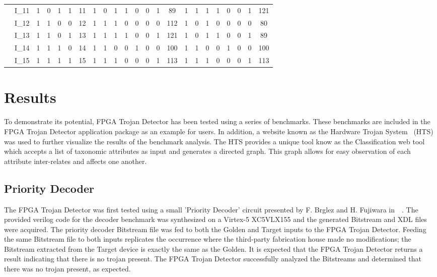 \documentclass[journal, hidelinks]{IEEEtran}
\begin{document}
\begin{table}[b!]
\begin{tabular}{CC|C|C|C|C|C||C|C|C|C|C|C|C|C||C|C|C|C|C|C|C|C|}
		 & I_{11} & 1 & 0 & 1 & 1 & 11 & 1 & 0 & 1 & 1 & 0 & 0 & 1 & 89 & 1 & 1 & 1 & 1 & 0 & 0 & 1 & 121 \\ 
		 & I_{12} & 1 & 1 & 0 & 0 & 12 & 1 & 1 & 1 & 0 & 0 & 0 & 0 & 112 & 1 & 0 & 1 & 0 & 0 & 0 & 0 & 80 \\ 
		 & I_{13} & 1 & 1 & 0 & 1 & 13 & 1 & 1 & 1 & 1 & 0 & 0 & 1 & 121 & 1 & 0 & 1 & 1 & 0 & 0 & 1 & 89 \\ 
		 & I_{14} & 1 & 1 & 1 & 0 & 14 & 1 & 1 & 0 & 0 & 1 & 0 & 0 & 100 & 1 & 1 & 0 & 0 & 1 & 0 & 0 & 100 \\ 
		 & I_{15} & 1 & 1 & 1 & 1 & 15 & 1 & 1 & 1 & 0 & 0 & 0 & 1 & 113 & 1 & 1 & 1 & 0 & 0 & 0 & 1 & 113 \\ \hline
	\end{tabular}
\end{table}
\section{Results} \label{sec:results}
To demonstrate its potential, FPGA Trojan Detector has been tested using a series of benchmarks.
These benchmarks are included in the FPGA Trojan Detector application package as an example for users.
In addition, a website known as the Hardware Trojan System~\cite{meCategorization} (HTS) was used to further visualize the results of the benchmark analysis.
The HTS provides a unique tool know as the Classification web tool which accepts a list of taxonomic attributes as input and generates a directed graph.
This graph allows for easy observation of each attribute inter-relates and affects one another.

\subsection{Priority Decoder} \label{sec:priorityDecoder}
The FPGA Trojan Detector was first tested using a small 'Priority Decoder' circuit presented by F. Brglez and H. Fujiwara
in~~\cite{iscas85}.
The provided verilog code for the decoder benchmark was synthesized on a Virtex-5 XC5VLX155 and the generated Bitstream and XDL files were acquired.
The priority decoder Bitstream file was fed to both the Golden and Target inputs to the FPGA Trojan Detector.
Feeding the same Bitstream file to both inputs replicates the occurrence where the third-party fabrication house made no modifications; the Bitstream extracted from the Target device is exactly the same as the Golden.
It is expected that the FPGA Trojan Detector returns a result indicating that there is no trojan present.
The FPGA Trojan Detector successfully analyzed the Bitstreams and determined that there was no trojan present, as expected.
\end{document}
